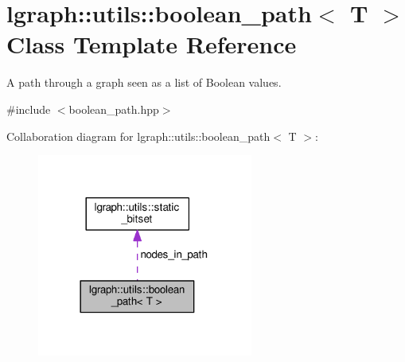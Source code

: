 \hypertarget{classlgraph_1_1utils_1_1boolean__path}{}\section{lgraph\+:\+:utils\+:\+:boolean\+\_\+path$<$ T $>$ Class Template Reference}
\label{classlgraph_1_1utils_1_1boolean__path}


A path through a graph seen as a list of Boolean values.  




{\ttfamily \#include $<$boolean\+\_\+path.\+hpp$>$}



Collaboration diagram for lgraph\+:\+:utils\+:\+:boolean\+\_\+path$<$ T $>$\+:\nopagebreak
\begin{figure}[H]
\begin{center}
\leavevmode
\includegraphics[width=201pt]{classlgraph_1_1utils_1_1boolean__path__coll__graph}
\end{center}
\end{figure}
